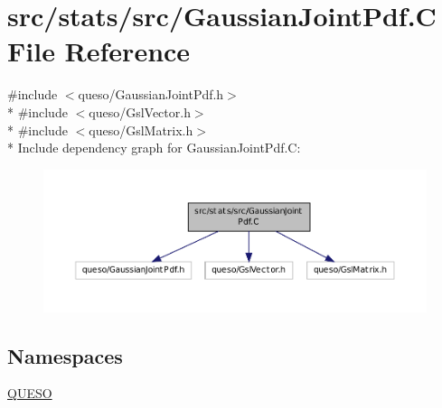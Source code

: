 \hypertarget{_gaussian_joint_pdf_8_c}{\section{src/stats/src/\-Gaussian\-Joint\-Pdf.C File Reference}
\label{_gaussian_joint_pdf_8_c}
}
{\ttfamily \#include $<$queso/\-Gaussian\-Joint\-Pdf.\-h$>$}\\*
{\ttfamily \#include $<$queso/\-Gsl\-Vector.\-h$>$}\\*
{\ttfamily \#include $<$queso/\-Gsl\-Matrix.\-h$>$}\\*
Include dependency graph for Gaussian\-Joint\-Pdf.\-C\-:
\nopagebreak
\begin{figure}[H]
\begin{center}
\leavevmode
\includegraphics[width=350pt]{_gaussian_joint_pdf_8_c__incl}
\end{center}
\end{figure}
\subsection*{Namespaces}
\begin{DoxyCompactItemize}
\item 
\hyperlink{namespace_q_u_e_s_o}{Q\-U\-E\-S\-O}
\end{DoxyCompactItemize}
